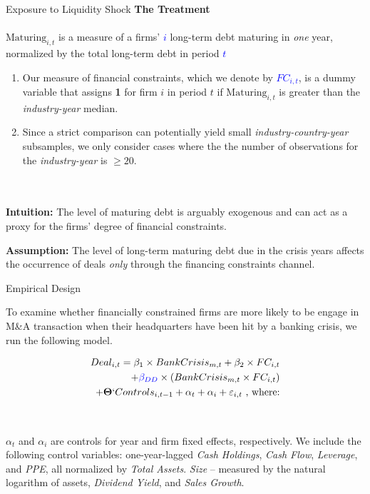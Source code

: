 \documentclass[10pt]{beamer}
\begin{document}
\begin{frame}{Exposure to Liquidity Shock}
    \textbf{The Treatment} 
    \\~\\
    $\text{Maturing}_{i,t}$ is a measure of a firms' \textcolor{blue}{$i$} long-term debt maturing in \textit{one} year, normalized by the total long-term debt in period \textcolor{blue}{$t$} %
    
    \begin{enumerate}
        \item  Our measure of financial constraints, which we denote by \textcolor{blue}{$FC_{i,t}$}, is a dummy variable that assigns \textbf{1} for firm $i$ in period $t$ if $\text{Maturing}_{i,t}$ is greater than the \textit{industry-year} median.

        \item Since a strict comparison can potentially yield small \textit{industry-country-year} subsamples, we only consider cases where the the number of observations for the \textit{industry-year} is $\geq 20$.
    \end{enumerate}
    \pause
    \\~\\
    \textbf{Intuition:} The level of maturing debt is arguably exogenous and can act as a proxy for the firms' degree of financial constraints.
    
    \textbf{Assumption:} The level of long-term maturing debt due in the crisis years affects the occurrence of deals \textit{ only} through the financing constraints channel.
    
\end{frame}
\begin{frame}{Empirical Design}

\begin{itemize}
    To examine whether financially constrained firms are more likely to be engage in M\&A transaction when their headquarters have been hit by a banking crisis, we run the following model.

    \begin{align}
        Deal_{i,t}= \beta_1\times BankCrisis_{m,t} + \beta_2\times FC_{i,t} \nonumber \\ + \textcolor{blue}{\beta_{DD}}\times (BankCrisis_{m,t}\times FC_{i,t}) \nonumber \\ +\mathbf{\Theta}`Controls_{i,t-1}  +\alpha_t + \alpha_i + \varepsilon_{i,t} \text{ , where:}
    \end{align}
    \\~\\
    $\alpha_t$ and $\alpha_i$ are controls for year and firm fixed effects, respectively.
    We include the following control variables: one-year-lagged \textit{Cash Holdings}, \textit{Cash Flow}, \textit{Leverage}, and \textit{PPE}, all normalized by \textit{Total Assets}. \textit{Size} -- measured by the natural logarithm of assets, \textit{Dividend Yield}, and \textit{Sales Growth}.
\end{itemize}
\end{frame}
\end{document}

